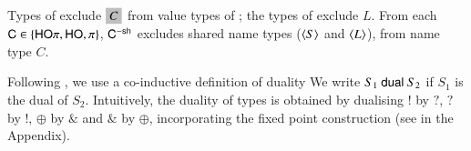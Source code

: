 
Types of \HO exclude $\nonhosyntax{C}$ from 
value types of \HOp; the types of \sessp exclude $L$. 
From each $\mathsf{C} \in \{\mathsf{HO}\pi, \mathsf{HO}, \pi \}$, $\mathsf{C}^{-\mathsf{sh}}$ 
excludes shared name types ($\langle S \rangle$ and $\langle L \rangle$), 
from name type $C$.

Following \cite{TGC14}, we use a co-inductive definition of duality
We write $S_1 \ \mathsf{dual}\  S_2$ if $S_1$ is the dual of $S_2$.   
Intuitively, the duality of types is obtained by 
dualising $!$ by $?$, $?$ by $!$, $\oplus$ by $\&$ and $\&$ by $\oplus$,  
incorporating the fixed point construction 
(see  in the Appendix). 


